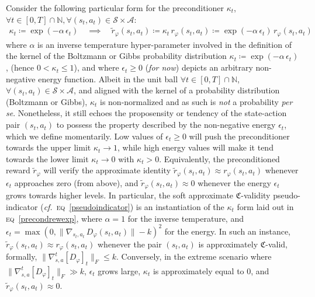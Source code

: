 Consider the following particular form for the preconditioner $\kappa_t$,
$\forall t \in [0, T] \cap \mathbb{N},
\forall (s_t, a_t) \in \mathcal{S} \times \mathcal{A}$:
\begin{align}
\kappa_t \coloneqq \exp (-\alpha \, \epsilon_t)
\quad \implies \quad
\tilde{r}_\varphi (s_t,a_t)
\coloneqq \kappa_t \, r_\varphi (s_t,a_t)
\coloneqq \exp (-\alpha \, \epsilon_t) \, r_\varphi (s_t,a_t)
\label{precondrewexp}
\end{align}
where $\alpha$ is an inverse temperature hyper-parameter involved in the definition of the kernel of
the Boltzmann or Gibbs probability distribution $\kappa_t \coloneqq \exp (-\alpha \, \epsilon_t)$,
(hence $0 < \kappa_t \leq 1$), and where
$\epsilon_t \geq 0$ (\textit{for now}) depicts an arbitrary non-negative energy function.
Albeit in the unit ball
$\forall t \in [0, T] \cap \mathbb{N}$,
$\forall (s_t, a_t) \in \mathcal{S} \times \mathcal{A}$, and aligned with the kernel of a
probability distribution (Boltzmann or Gibbs),
$\kappa_t$ is non-normalized and as such is \emph{not} a probability \textit{per se}.
Nonetheless, it still echoes the proposensity or tendency of the state-action pair $(s_t,a_t)$
to possess the property described by the non-negative energy $\epsilon_t$, which we define momentarily.
Low values of $\epsilon_t \geq 0$
will push the preconditioner towards the upper limit $\kappa_t \to 1$,
while high energy values will make it tend towards the lower limit $\kappa_t \to 0$ with $\kappa_t > 0$.
Equivalently, the preconditioned reward $\tilde{r}_\varphi$ will verify the approximate identity
$\tilde{r}_\varphi (s_t,a_t) \approx r_\varphi (s_t,a_t)$ whenever $\epsilon_t$
approaches zero (from above), and $\tilde{r}_\varphi (s_t,a_t) \approx 0$ whenever
the energy $\epsilon_t$ grows towards higher levels.
In particular,
the soft approximate $\mathfrak{C}$-validity pseudo-indicator
(\textit{cf.}~\textsc{eq}~\ref{pseudoindicator})
is an instantiation of the $\kappa_t$ form laid out in \textsc{eq}~\ref{precondrewexp},
where $\alpha=1$ for the inverse temperature, and
$\epsilon_t = \max (0, \lVert \nabla_{s_t,a_t} \, D_\varphi (s_t,a_t) \rVert - k)^2$ for the energy.
In such an instance, $\tilde{r}_\varphi (s_t,a_t) \approx r_\varphi (s_t,a_t)$
whenever the pair $(s_t,a_t)$ is approximately $\mathfrak{C}$-valid, formally,
$\lVert \nabla_{s,a}^t[D_\varphi]_t \rVert _F \leq k$.
Conversely, in the extreme scenario where $\lVert \nabla_{s,a}^t[D_\varphi]_t \rVert _F \gg k$,
$\epsilon_t$ grows large,
$\kappa_t$ is approximately equal to $0$,
and $\tilde{r}_\varphi (s_t,a_t) \approx 0$.
